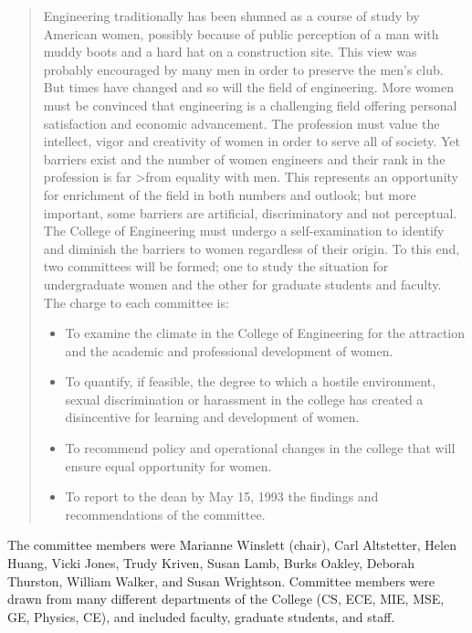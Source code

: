 \begin{quote}
	Engineering traditionally has been shunned as a course of study by
American women, possibly because of public perception of a man with muddy
boots and a hard hat on a construction site.  This view was probably
encouraged by many men in order to preserve the men's club.  But times have
changed and so will the field of engineering.  More women must be convinced
that engineering is a challenging field offering personal satisfaction and
economic advancement.  The profession must value the intellect, vigor and
creativity of women in order to serve all of society.  Yet barriers exist
and the number of women engineers and their rank in the profession is far
>from equality with men.  This represents an opportunity for enrichment of
the field in both numbers and outlook; but more important, some barriers
are artificial, discriminatory and not perceptual.  The College of
Engineering must undergo a self-examination to identify and diminish the
barriers to women regardless of their origin.  To this end, two committees
will be formed; one to study the situation for undergraduate women and the
other for graduate students and faculty.  The charge to each committee is:

\begin{itemize}

\item
To examine the climate in the College of Engineering for the attraction and
the academic and professional development of women.

\item
To quantify, if feasible, the degree to which a hostile environment, sexual
discrimination or harassment in the college has created a disincentive for
learning and development of women.

\item
To recommend policy and operational changes in the college that will ensure
equal opportunity for women.

\item
To report to the dean by May 15, 1993 the findings and recommendations of
the committee.

\end{itemize}
\end{quote}

The committee members were
Marianne Winslett (chair),
Carl Altstetter,
Helen Huang,
Vicki Jones,
Trudy Kriven,
Susan Lamb,
Burks Oakley,
Deborah Thurston,
William Walker, and
Susan Wrightson.
Committee members were drawn from many different departments of the College
(CS, ECE, MIE, MSE, GE, Physics, CE), 
and included faculty, graduate students, and staff.

